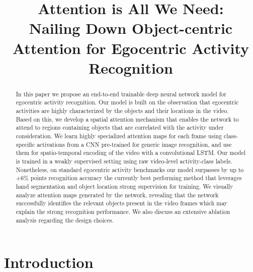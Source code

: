 \documentclass{bmvc2k}
\title{Attention is All We Need:\\Nailing Down Object-centric Attention for Egocentric Activity Recognition}
\newcommand{\rev}[2]{#2}
\begin{document}
\maketitle

\begin{abstract}

In this paper we propose an end-to-end trainable deep neural network model for egocentric activity recognition. Our model is built on the observation that egocentric activities are highly characterized by the objects and their locations in the video. Based on this, we develop a spatial attention mechanism that enables the network to attend to regions containing objects that are correlated with the activity under consideration. We learn highly specialized \rev{spatial}{} attention maps for each frame using class-specific activations from a CNN pre-trained for generic image recognition, and use them for spatio-temporal encoding of the video with a convolutional LSTM. \rev{We validate our method on standard egocentric activity benchmarks, our model surpasses state-of-the-art recognition accuracy by a large margin, with an average improvement of 19\% compared to existing approaches.}{Our model is trained in a weakly supervised setting using raw video-level activity-class labels. Nonetheless, on standard egocentric activity benchmarks our model surpasses by up to +6\% points recognition accuracy the currently best performing method that leverages hand segmentation and object location strong supervision for training.}
We \rev{}{visually analyze attention maps generated by the network, revealing that the network successfully identifies the relevant objects present in the video frames which may explain the strong recognition performance. We} also discuss an extensive ablation analysis regarding the design choices.


\end{abstract}

\section{Introduction}
\label{sec:intro}
\end{document}
